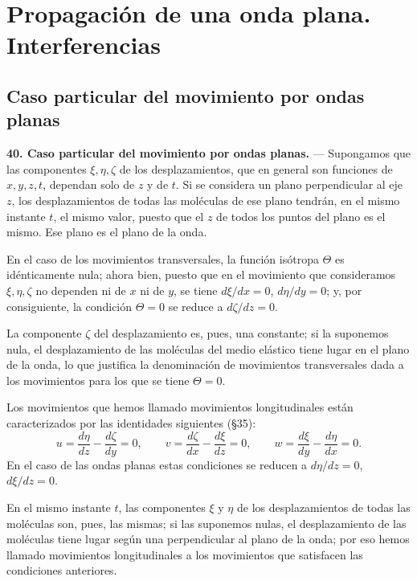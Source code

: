 \chapter{Propagación de una onda plana. Interferencias}
\label{cap:ondaplana}

\section{Caso particular del movimiento por ondas planas}

\noindent\textbf{40. Caso particular del movimiento por ondas planas.} —
Supongamos que las componentes $\xi,\eta,\zeta$ de
los desplazamientos, que en general son funciones de $x,y,z,t$, dependan
solo de $z$ y de $t$. Si se considera un plano perpendicular al eje $z$,
los desplazamientos de todas las moléculas de ese plano tendrán, en el
mismo instante $t$, el mismo valor, puesto que el $z$ de todos los puntos
del plano es el mismo. Ese plano es el plano de la onda.

En el caso de los movimientos transversales, la función isótropa $\Theta$
es idénticamente nula; ahora bien, puesto que en el movimiento que
consideramos $\xi,\eta,\zeta$ no dependen ni de $x$ ni de $y$, se tiene
$d\xi/dx=0$, $d\eta/dy=0$; y, por consiguiente, la condición $\Theta=0$ se
reduce a $d\zeta/dz=0$.

La componente $\zeta$ del desplazamiento es, pues, una constante; si la
suponemos nula, el desplazamiento de las moléculas del medio elástico
tiene lugar en el plano de la onda, lo que justifica la denominación de
movimientos transversales dada a los movimientos para los que se tiene
$\Theta=0$.

Los movimientos que hemos llamado movimientos longitudinales están
caracterizados por las identidades siguientes (§35):
\[
u=\frac{d\eta}{dz}-\frac{d\zeta}{dy}=0,\qquad
v=\frac{d\zeta}{dx}-\frac{d\xi}{dz}=0,\qquad
w=\frac{d\xi}{dy}-\frac{d\eta}{dx}=0.
\]
En el caso de las ondas planas estas condiciones se reducen a
$d\eta/dz=0$, $d\xi/dz=0$.

En el mismo instante $t$, las componentes $\xi$ y $\eta$ de los
desplazamientos de todas las moléculas son, pues, las mismas; si las
suponemos nulas, el desplazamiento de las moléculas tiene lugar según una
perpendicular al plano de la onda; por eso hemos llamado movimientos
longitudinales a los movimientos que satisfacen las condiciones
anteriores.

